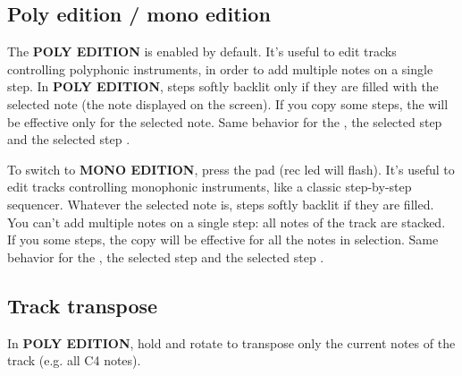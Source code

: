 

\subsection{Poly edition / mono edition}


The \textbf{POLY EDITION} is enabled by default. It's useful to edit tracks controlling polyphonic instruments, in order to add multiple notes on a single step. In \textbf{POLY EDITION}, steps softly backlit only if they are filled with the selected note (the note displayed on the screen). If you  copy  some steps, the  will be effective only for the selected note. Same behavior for the , the selected step  and the selected step .

To switch to \textbf{MONO EDITION}, press the  pad (rec led will flash). It's useful to edit tracks controlling monophonic instruments, like a classic step-by-step sequencer. Whatever the selected note is, steps softly backlit if they are filled. You can't add multiple notes on a single step: all notes of the track are stacked. If you   some steps, the copy will be effective for all the notes in selection. Same behavior for the , the selected step  and the selected step .


\subsection{Track transpose}

In \textbf{POLY EDITION}, hold  and rotate \encodericon{} to transpose only the current notes of the track (e.g. all C4 notes).


